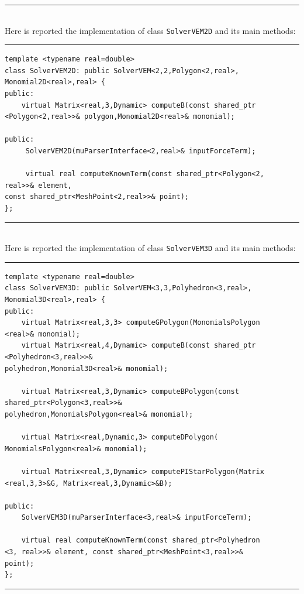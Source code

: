 \noindent\rule{16cm}{1pt}\\

Here is reported the implementation of class \verb|SolverVEM2D| and its main methods:

\noindent\rule{16cm}{1pt}
\begin{lstlisting}[caption=File \texttt{SolverVEM2D.h}]
template <typename real=double>
class SolverVEM2D: public SolverVEM<2,2,Polygon<2,real>,
Monomial2D<real>,real> {
public:
    virtual Matrix<real,3,Dynamic> computeB(const shared_ptr
<Polygon<2,real>>& polygon,Monomial2D<real>& monomial);

public:
     SolverVEM2D(muParserInterface<2,real>& inputForceTerm);
    
     virtual real computeKnownTerm(const shared_ptr<Polygon<2,
real>>& element,
const shared_ptr<MeshPoint<2,real>>& point);
};
\end{lstlisting}

\noindent\rule{16cm}{1pt}\\

Here is reported the implementation of class \verb|SolverVEM3D| and its main methods:

\noindent\rule{16cm}{1pt}
\begin{lstlisting}[caption=File \texttt{SolverVEM3D.h}]
template <typename real=double>
class SolverVEM3D: public SolverVEM<3,3,Polyhedron<3,real>,
Monomial3D<real>,real> {
public:
    virtual Matrix<real,3,3> computeGPolygon(MonomialsPolygon
<real>& monomial);
    virtual Matrix<real,4,Dynamic> computeB(const shared_ptr
<Polyhedron<3,real>>& 
polyhedron,Monomial3D<real>& monomial);

    virtual Matrix<real,3,Dynamic> computeBPolygon(const 
shared_ptr<Polygon<3,real>>& 
polyhedron,MonomialsPolygon<real>& monomial);

    virtual Matrix<real,Dynamic,3> computeDPolygon(
MonomialsPolygon<real>& monomial);
		
    virtual Matrix<real,3,Dynamic> computePIStarPolygon(Matrix
<real,3,3>&G, Matrix<real,3,Dynamic>&B);
	
public:
    SolverVEM3D(muParserInterface<3,real>& inputForceTerm);
 
    virtual real computeKnownTerm(const shared_ptr<Polyhedron
<3, real>>& element, const shared_ptr<MeshPoint<3,real>>& 
point);	
};

\end{lstlisting}
\noindent\rule{16cm}{1pt}\\

